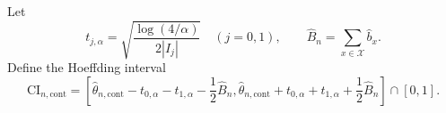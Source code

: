 Let
\[
 t_{j,\alpha}=\sqrt{\frac{\log(4/\alpha)}{2|I_j|}}
 \quad(j=0,1),
 \qquad \widehat B_n=\sum_{x\in\mathcal X}\widehat b_x.
\]
Define the Hoeffding interval
\[
 \mathrm{CI}_{n,\mathrm{cont}}
 =\left[
 \widehat\theta_{n,\mathrm{cont}}-t_{0,\alpha}-t_{1,\alpha}-\frac12\widehat B_n,
 \widehat\theta_{n,\mathrm{cont}}+t_{0,\alpha}+t_{1,\alpha}+\frac12\widehat B_n
 \right]\cap[0,1].
\]